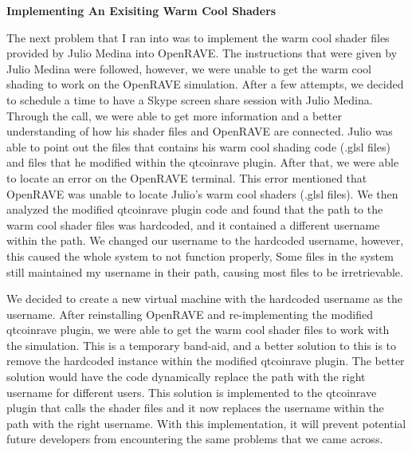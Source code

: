 \documentclass[10pt,journal,compsoc,draftclsnofoot]{IEEEtran}
\begin{document}
\begin{flushleft}
\vspace{3mm}

\textbf{Implementing An Exisiting Warm Cool Shaders}
\par
The next problem that I ran into was to implement the warm cool shader files provided by Julio Medina into OpenRAVE.
The instructions that were given by Julio Medina were followed, however, we were unable to get the warm cool shading to work on the OpenRAVE simulation.
After a few attempts, we decided to schedule a time to have a Skype screen share session with Julio Medina.
Through the call, we were able to get more information and a better understanding of how his shader files and OpenRAVE are connected.
Julio was able to point out the files that contains his warm cool shading code (.glsl files) and files that he modified within the qtcoinrave plugin.
After that, we were able to locate an error on the OpenRAVE terminal.
This error mentioned that OpenRAVE was unable to locate Julio's warm cool shaders (.glsl files).
We then analyzed the modified qtcoinrave plugin code and found that the path to the warm cool shader files was hardcoded, and it contained a different username within the path.
We changed our username to the hardcoded username, however, this caused the whole system to not function properly,
Some files in the system still maintained my username in their path, causing most files to be irretrievable.
\par
We decided to create a new virtual machine with the hardcoded username as the username.
After reinstalling OpenRAVE and re-implementing the modified qtcoinrave plugin, we were able to get the warm cool shader files to work with the simulation.
This is a temporary band-aid, and a better solution to this is to remove the hardcoded instance within the modified qtcoinrave plugin.
The better solution would have the code dynamically replace the path with the right username for different users.
This solution is implemented to the qtcoinrave plugin that calls the shader files and it now replaces the username within the path with the right username.
With this implementation, it will prevent potential future developers from encountering the same problems that we came across.


\newpage

\end{flushleft}
\end{document}
